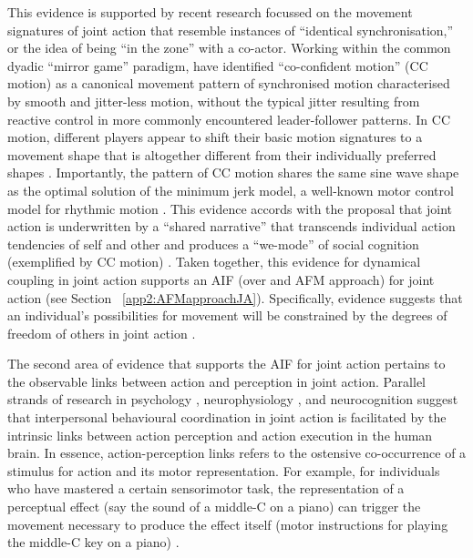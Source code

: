 \begin{CJK}{UTF8}{gbsn}
This evidence is supported by recent research focussed on the movement signatures of joint action that resemble instances of ``identical synchronisation,'' or the idea of being ``in the zone'' with a co-actor. Working within the common dyadic ``mirror game'' paradigm, \textcite{Noy2011,Noy2015,Hart2014} have identified ``co-confident motion'' (CC motion) as a canonical movement pattern of synchronised motion characterised by smooth and jitter-less motion, without the typical jitter resulting from reactive control in more commonly encountered leader-follower patterns.  In CC motion, different players appear to shift their basic motion signatures to a movement shape that is altogether different from their individually preferred shapes \citep{Hart2014}. Importantly, the pattern of CC motion shares the same sine wave shape as the optimal solution of the minimum jerk model, a well-known motor control model for rhythmic motion \citep{Hogan2007}.  This evidence accords with the proposal that joint action is underwritten by a ``shared narrative'' that transcends individual action tendencies of self and other and produces a  ``we-mode'' of social cognition (exemplified by CC motion) \citep{Gallotti2013}.  Taken together, this evidence for dynamical coupling in joint action supports an AIF (over and AFM approach) for joint action (see Section ~\ref{app2:AFMapproachJA}).  Specifically, evidence suggests that an individual's possibilities for movement will be constrained by the degrees of freedom of others in joint action \citep{Richardson2015}.



The second area of evidence that supports the AIF for joint action pertains to the observable links between action and perception in joint action.  Parallel strands of research in psychology \citep{Prinz1990,Prinz1997,Prinz2013}, neurophysiology \citep{Rizzolatti2004,Rizzolatti2010}, and neurocognition \citep{Wolpert1998,Wolpert2000} suggest that interpersonal behavioural coordination in joint action is facilitated by the intrinsic links between action perception and action execution in the human brain.  In essence, action-perception links refers to the ostensive co-occurrence of a stimulus for action and its motor representation.  For example, for individuals who have mastered a certain sensorimotor task, the representation of a perceptual effect (say the sound of a middle-C on a piano) can trigger the movement necessary to produce the effect itself (motor instructions for playing the middle-C key on a piano) \citep{Novembre2014}.


\end{CJK}
